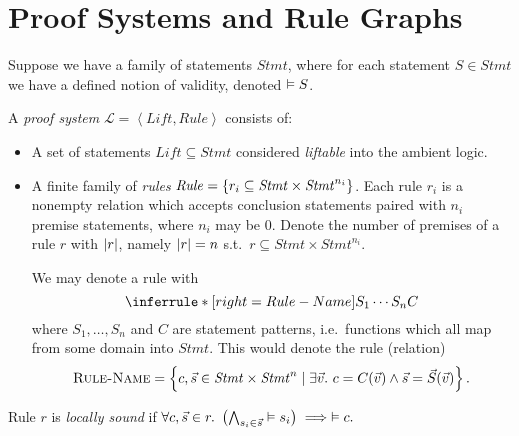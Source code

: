 
\section{Proof Systems and Rule Graphs}

\newcommand*{\DomLiftable}{\mathit{Lift}}
\newcommand*{\DomStmt}{\mathit{Stmt}}
\newcommand*{\DomRule}{\mathit{Rule}}
\newcommand*{\LIFT}{\textsc{Lift}}

Suppose we have a family of statements $\DomStmt$,
where for each statement $S \in \DomStmt$
we have a defined notion of validity,
denoted $\vDash S$.

\newcommand*{\proofsysname}{\mathcal{L}}
\newcommand*{\proofsys}[2]{\left\langle #1, #2\right\rangle}

\newcommand*{\numprems}[1]{
    \abs{#1}
}

\begin{definition}
    A \emph{proof system} 
    $\proofsysname = \proofsys\DomLiftable\DomRule$
    consists of:
    \begin{itemize}
    \item A set of statements $\DomLiftable \subseteq \DomStmt$ considered \emph{liftable} into the ambient logic.
    \item A finite family of \emph{rules}
    $\DomRule = \set{r_i \subseteq \DomStmt \times \DomStmt^{n_i}}$.
    Each rule $r_i$ is a nonempty relation which accepts
    conclusion statements paired with
    $n_i$ premise statements, where $n_i$ may be 0.
    Denote the number of premises of a rule $r$
    with $\numprems r$,
    namely $\numprems r = n$ s.t.\
    $r \subseteq \DomStmt \times \DomStmt^{n_i}$.

    We may denote a rule with
    \[
        \inferrule*[right=Rule-Name]{
            S_1 \\ \cdots \\ S_n
        }{
            C
        }
    \]
    where $S_1,\dots,S_n$ and $C$ are statement patterns, i.e.\ functions which all map from some domain into $\DomStmt$.
    This would denote the rule (relation)
    \[
        \textsc{Rule-Name} =
        \SetBuild(
            c, \vec s \in \DomStmt \times \DomStmt^n
        |
            {\exists \vec v.\
            c = C(\vec v) \wedge
            \vec s = \vec S(\vec v)}
        ).
    \]
    \end{itemize} 
\end{definition}
%
\begin{definition}
    \label{def:locally-sound-rule}
    Rule $r$ is \emph{locally sound} if
    \(
        \forall c, \vec s \in r.\
        \left(
            \bigwedge_{s_i \in \vec s}
            \vDash s_i
        \right)
        \implies \vDash c.
    \)
\end{definition}
%

